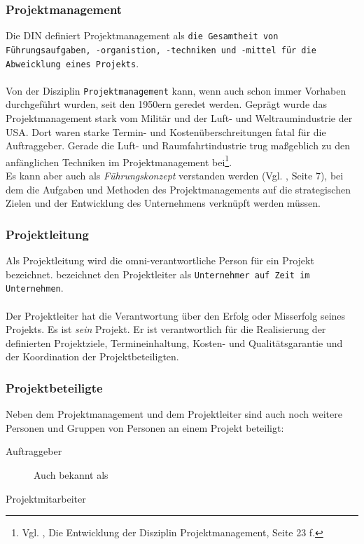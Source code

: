 \documentclass[12pt]{scrartcl}
\begin{document}
\subsubsection{Projektmanagement}
Die DIN definiert Projektmanagement als \texttt{die Gesamtheit von Führungsaufgaben, -organistion, -techniken und -mittel für die Abweicklung eines Projekts}.\\
\\
Von der Disziplin \texttt{Projektmanagement} kann, wenn auch schon immer Vorhaben durchgeführt wurden, seit den 1950ern geredet werden. Geprägt wurde das Projektmanagement stark vom Militär und der Luft- und Weltraumindustrie der USA. Dort waren starke Termin- und Kostenüberschreitungen fatal für die Auftraggeber. Gerade die Luft- und Raumfahrtindustrie trug maßgeblich zu den anfänglichen Techniken im Projektmanagement bei\footnote{Vgl. \cite{proj_zum_erfolg_fuehren}, Die Entwicklung der Disziplin Projektmanagement, Seite 23 f.}. 
\\
Es kann aber auch als \textit{Führungskonzept} verstanden werden (Vgl. \cite{scriptPM}, Seite 7), bei dem die Aufgaben und Methoden des Projektmanagements auf die strategischen Zielen und der Entwicklung des Unternehmens verknüpft werden müssen. 

\subsubsection{Projektleitung}
Als Projektleitung wird die omni-verantwortliche Person für ein Projekt bezeichnet. \cite{proj_zum_erfolg_fuehren} bezeichnet den Projektleiter als \texttt{Unternehmer auf Zeit im Unternehmen}. \\
\\
Der Projektleiter hat die Verantwortung über den Erfolg oder Misserfolg seines Projekts. Es ist \textit{sein} Projekt. Er ist verantwortlich für die Realisierung der definierten Projektziele, Termineinhaltung, Kosten- und Qualitätsgarantie und der Koordination der Projektbeteiligten. 

\subsubsection{Projektbeteiligte}
Neben dem Projektmanagement und dem Projektleiter sind auch noch weitere Personen und Gruppen von Personen an einem Projekt beteiligt:
\begin{description}
    \item[Auftraggeber]
    Auch bekannt als 
    \item[Projektmitarbeiter]
\end{description}
\end{document}
